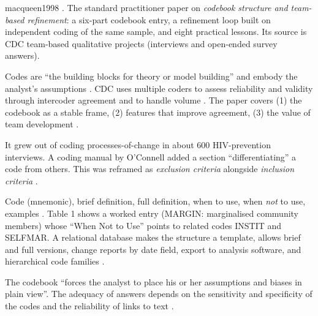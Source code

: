 \begin{papercard}{macqueen1998}
  . The standard practitioner paper on \emph{codebook structure and team-based refinement}: a six-part codebook entry, a refinement loop built on independent coding of the same sample, and eight practical lessons. Its source is CDC team-based qualitative projects (interviews and open-ended survey answers).

 Codes are ``the building blocks for theory or model building'' and embody the analyst's assumptions . CDC uses multiple coders to assess reliability and validity through intercoder agreement and to handle volume . The paper covers (1) the codebook as a stable frame, (2) features that improve agreement, (3) the value of team development .

 It grew out of coding processes-of-change in about 600 HIV-prevention interviews. A coding manual by O'Connell added a section ``differentiating'' a code from others. This was reframed as \emph{exclusion criteria} alongside \emph{inclusion criteria} .

 Code (mnemonic), brief definition, full definition, when to use, when \emph{not} to use, examples . Table 1 shows a worked entry (MARGIN: marginalised community members) whose ``When Not to Use'' points to related codes INSTIT and SELFMAR. A relational database makes the structure a template, allows brief and full versions, change reports by date field, export to analysis software, and hierarchical code families .

 The codebook ``forces the analyst to place his or her assumptions and biases in plain view''. The adequacy of answers depends on the sensitivity and specificity of the codes and the reliability of links to text .


\end{papercard}
